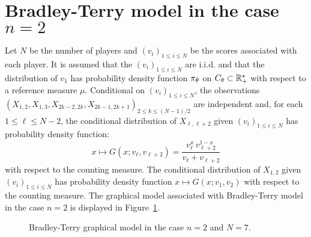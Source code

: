 \section*{Bradley-Terry model in the case $n=2$}
Let $N$ be the number of players and $(v_i)_{1\le i\le N}$ be the scores associated with each player. It is assumed that the $(v_i)_{1\le i\le N}$ are i.i.d. and that the distribution of $v_1$ has probability density function $\pi_{\theta}$ on $C_{\theta}\subset \mathbb{R}_+^{\star}$ with respect to a reference measure $\mu$. Conditional on $(v_i)_{1 \le i \le N}$, the observations $(X_{1,2},X_{1,3}, X_{2k-2,2k}, X_{2k-1,2k+1})_{2\le k \le (N-1)/2}$ are independent and, for each $1\le \ell\le N-2$, the conditional distribution of $X_{\ell,\ell+2}$ given $(v_i)_{1\le i\le N}$ has probability density function:
\begin{equation}
\label{eq:defG}
x\mapsto G (x;v_{\ell},v_{\ell+2}) = \frac{v_{\ell}^x\,v_{\ell+2}^{1-x}}{v_{\ell} + v_{\ell+2}}
\end{equation}
with respect to the counting measure. The conditional distribution of $X_{1,2}$ given $(v_i)_{1\le i\le N}$ has probability density function $x\mapsto G (x;v_{1},v_{2})$ with respect to the counting measure.
The graphical model associated with Bradley-Terry model in the case $n=2$ is displayed in Figure~\ref{fig:bt}.
\begin{figure}[h!]
\centering
{}
\caption{Bradley-Terry graphical model in the case $n=2$ and $N=7$.}
\label{fig:bt}
\end{figure}

